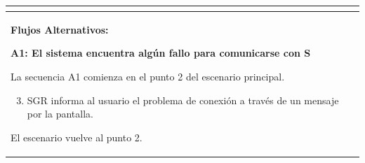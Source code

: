 \begin{longtable}{|l|p{5.5cm}|l|p{2cm}|l|p{1.9cm}|}
{					} \\ \hline

					\multicolumn{6}{|p{15cm}|}{ \textbf{Flujos Alternativos: }
					
					\textbf{A1: El sistema encuentra algún fallo para comunicarse con S}
					
					La secuencia A1 comienza en el punto 2 del escenario principal.
					\begin{enumerate}
							\setcounter{enumi}{2}
							\item SGR informa al usuario el problema de conexión a través de un mensaje por la pantalla.
					\end{enumerate}

					El escenario vuelve al punto 2.

					} \\ \hline

			\end{longtable}

